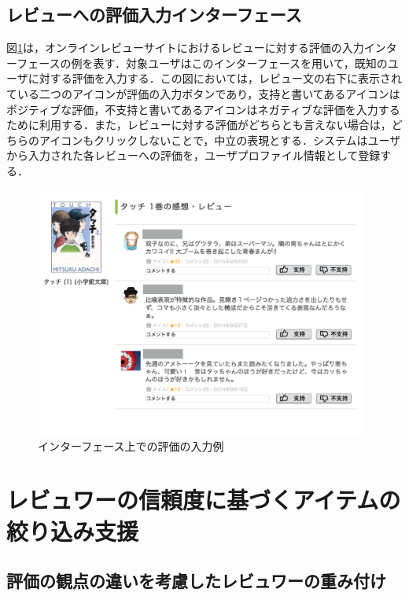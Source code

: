 \documentclass[a4paper,11pt,oneside,openany]{jsbook}
\begin{document}
	\section{レビューへの評価入力インターフェース}
\label{sec:feedback}
図\ref{fig:feedback_image}は，オンラインレビューサイトにおけるレビューに対する評価の入力インターフェースの例を表す．対象ユーザはこのインターフェースを用いて，既知のユーザに対する評価を入力する．この図においては，レビュー文の右下に表示されている二つのアイコンが評価の入力ボタンであり，支持と書いてあるアイコンはポジティブな評価，不支持と書いてあるアイコンはネガティブな評価を入力するために利用する．また，レビューに対する評価がどちらとも言えない場合は，どちらのアイコンもクリックしないことで，中立の表現とする．システムはユーザから入力された各レビューへの評価を，ユーザプロファイル情報として登録する．

\begin{figure}[tb]
	\begin{center} %
		\includegraphics[width = 110mm]{figures/feedback_image.pdf} %
	\end{center}
	\caption{インターフェース上での評価の入力例} %
	\label{fig:feedback_image} %
\end{figure}




\chapter{レビュワーの信頼度に基づくアイテムの絞り込み支援}
	\section{評価の観点の違いを考慮したレビュワーの重み付け}
\end{document}
